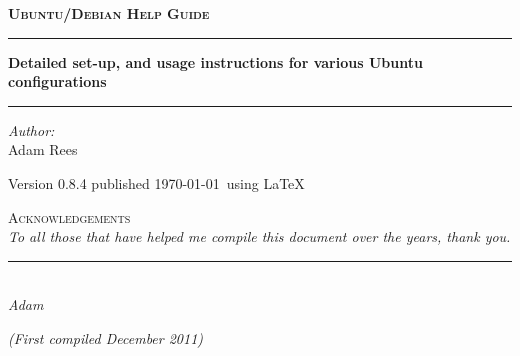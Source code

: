 \begin{center}
\thispagestyle{plain}

\vspace*{5cm}

\textsc{\huge\textbf{Ubuntu/Debian Help Guide}}\\[2.5cm]

\hrule
\vspace{0.5cm}
{\Huge \textbf{Detailed set-up, and usage instructions for various Ubuntu configurations}} \\[0.5cm]
\hrule
\vspace{2.5cm}
\LARGE \emph{Author:}\\ Adam Rees
\vfill

\large Version 0.8.4 published \today ~using \LaTeX
\end{center}

\newpage

\begin{center}

\vspace*{1cm}

{\Huge\textsc{Acknowledgements}}\\[4.5cm]
\textit{To all those that have helped me compile this document over the years, thank you.}\\[1.5cm]
\begin{flushright}
\rule{5cm}{0.25mm}\\[0.1cm]
{\large\textsl{Adam}}
\end{flushright}
\vfill
\large \textit{(First compiled December 2011)}
\end{center}

\tableofcontents
\listoftables
\listoffigures